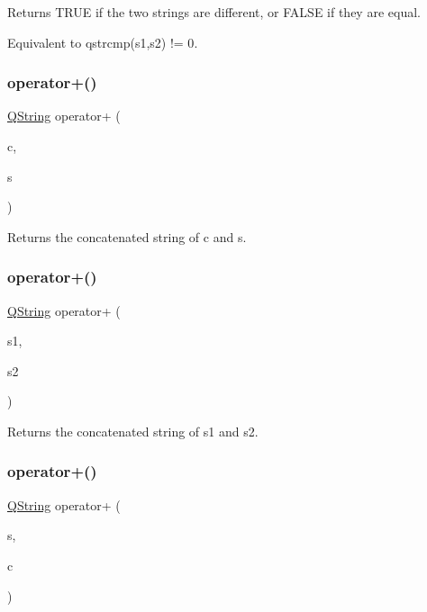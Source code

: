 Returns T\+R\+UE if the two strings are different, or F\+A\+L\+SE if they are equal.

Equivalent to {\ttfamily qstrcmp(s1,s2) != 0}. \mbox{\label{class_q_string_ab79668b32f01247149267b5b77669165}} 
\subsubsection{\texorpdfstring{operator+()}{operator+()}\hspace{0.1cm}{\footnotesize\ttfamily [1/5]}}
{\footnotesize\ttfamily \mbox{\hyperlink{class_q_string}{Q\+String}} operator+ (\begin{DoxyParamCaption}\item[{char}]{c,  }\item[{const \mbox{\hyperlink{class_q_string}{Q\+String}} \&}]{s }\end{DoxyParamCaption})\hspace{0.3cm}{\ttfamily [related]}}

Returns the concatenated string of c and s. \mbox{\label{class_q_string_ad31066c16adb556c4e773939da16a894}} 
\subsubsection{\texorpdfstring{operator+()}{operator+()}\hspace{0.1cm}{\footnotesize\ttfamily [2/5]}}
{\footnotesize\ttfamily \mbox{\hyperlink{class_q_string}{Q\+String}} operator+ (\begin{DoxyParamCaption}\item[{const char $\ast$}]{s1,  }\item[{const \mbox{\hyperlink{class_q_string}{Q\+String}} \&}]{s2 }\end{DoxyParamCaption})\hspace{0.3cm}{\ttfamily [related]}}

Returns the concatenated string of s1 and s2. \mbox{\label{class_q_string_a646dae5a832bf142e3fd6eed4cd29263}} 
\subsubsection{\texorpdfstring{operator+()}{operator+()}\hspace{0.1cm}{\footnotesize\ttfamily [3/5]}}
{\footnotesize\ttfamily \mbox{\hyperlink{class_q_string}{Q\+String}} operator+ (\begin{DoxyParamCaption}\item[{const \mbox{\hyperlink{class_q_string}{Q\+String}} \&}]{s,  }\item[{char}]{c }\end{DoxyParamCaption})\hspace{0.3cm}{\ttfamily [related]}}

